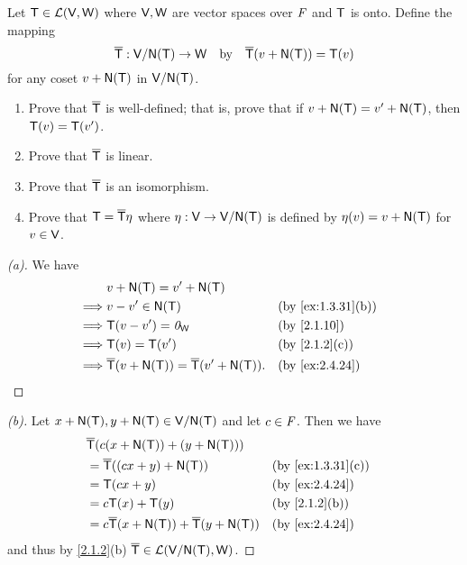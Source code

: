 \begin{ex}\label{ex:2.4.24}
  Let \(\mathsf{T} \in \mathcal{L}(\mathsf{V}, \mathsf{W})\) where \(\mathsf{V}, \mathsf{W}\) are vector spaces over \(\mathit{F}\) and \(\mathsf{T}\) is onto.
  Define the mapping
  \[
    \overline{\T} : \V / \ns{\T} \to \W \quad \text{by} \quad \overline{\T}(v + \ns{\T}) = \T(v)
  \]
  for any coset \(v + \ns{\T}\) in \(\V / \ns{\T}\).
  \begin{enumerate}
    \item Prove that \(\overline{\mathsf{T}}\) is well-defined;
          that is, prove that if \(v + \ns{\T} = v' + \ns{\T}\), then \(\mathsf{T}(v) = \mathsf{T}(v')\).
    \item Prove that \(\overline{\mathsf{T}}\) is linear.
    \item Prove that \(\overline{\mathsf{T}}\) is an isomorphism.
    \item Prove that \(\mathsf{T} = \overline{\mathsf{T}} \eta\) where \(\eta : \V \to \V / \ns{\T}\) is defined by \(\eta(v) = v + \ns{\T}\) for \(v \in \mathsf{V}\).
  \end{enumerate}
\end{ex}

\begin{proof}[(a)]
  We have
  \begin{align*}
             & v + \ns{\T} = v' + \ns{\T}                                                       \\
    \implies & v - v' \in \ns{\T}                                        &  & \by{ex:1.3.31}[b] \\
    \implies & \T(v - v') = \zv_{\W}                                     &  & \by{2.1.10}       \\
    \implies & \T(v) = \T(v')                                            &  & \by{2.1.2}[c]     \\
    \implies & \overline{\T}(v + \ns{\T}) = \overline{\T}(v' + \ns{\T}). &  & \by{ex:2.4.24}
  \end{align*}
\end{proof}

\begin{proof}[(b)]
  Let \(x + \ns{\T}, y + \ns{\T} \in \V / \ns{\T}\) and let \(c \in \mathit{F}\).
  Then we have
  \begin{align*}
     & \overline{\T}(c (x + \ns{\T}) + (y + \ns{\T}))                                     \\
     & = \overline{\T}((cx + y) + \ns{\T})                         &  & \by{ex:1.3.31}[c] \\
     & = \T(cx + y)                                                &  & \by{ex:2.4.24}    \\
     & = c \T(x) + \T(y)                                           &  & \by{2.1.2}[b]     \\
     & = c \overline{\T}(x + \ns{\T}) + \overline{\T}(y + \ns{\T}) &  & \by{ex:2.4.24}
  \end{align*}
  and thus by \cref{2.1.2}(b) \(\overline{\T} \in \ls(\V / \ns{\T}, \W)\).
\end{proof}

